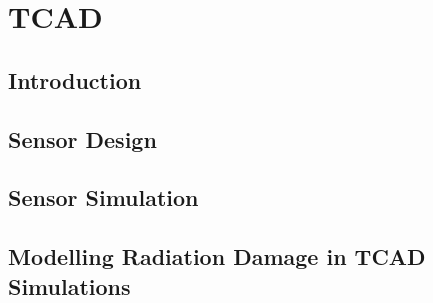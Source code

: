 \chapter{TCAD}

\section{Introduction}

\section{Sensor Design}

\section{Sensor Simulation}

\section{Modelling Radiation Damage in TCAD Simulations}

